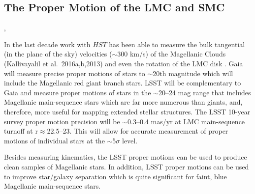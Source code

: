 %
%

\subsection{The Proper Motion of the LMC and SMC}
\def\secname{\chpname:propermotion}\label{sec:\secname}

,


In the last decade work with $HST$ has been able to measure the bulk
tangential (in the plane of the sky) velocities ($\sim$300 km/s) of
the Magellanic Clouds (Kallivayalil et al.\ 2016a,b,2013) and even the
rotation of the LMC disk \citep{2014ApJ...781..121V}. Gaia
will measure precise proper motions of stars to $\sim$20th magnitude
which will include the Magellanic red giant branch stars. LSST will be
complementary to Gaia and measure proper motions of stars in the
$\sim$20--24 mag range that includes Magellanic main-sequence stars
which are far more numerous than giants, and, therefore, more useful
for mapping extended stellar structures. The LSST 10-year survey
proper motion precision will be $\sim$0.3--0.4 mas/yr at LMC
main-sequence turnoff at r$\approx$22.5--23.  This will allow for
accurate measurement of proper motions of individual stars at the
$\sim$5$\sigma$ level.


Besides measuring kinematics, the LSST proper motions can be used to
produce clean samples of Magellanic stars.
In addition, LSST proper motions can be used to improve star/galaxy
separation which is quite significant for faint, blue Magellanic
main-sequence stars.



